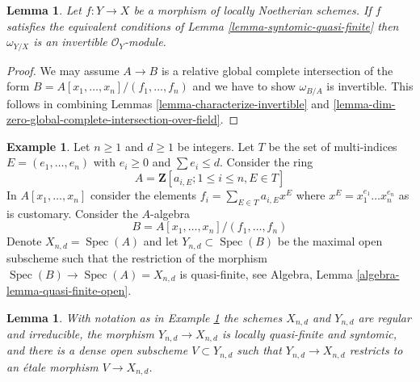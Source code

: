 \documentclass{stacks-project}
\theoremstyle{plain}
\newtheorem{lemma}[subsection]{Lemma}
\theoremstyle{definition}
\newtheorem{example}[subsection]{Example}
\theoremstyle{remark}
\numberwithin{equation}{subsection}
\def\Spec{\mathop{\mathrm{Spec}}}
\begin{document}
\begin{lemma}
\label{lemma-dualizing-syntomic-quasi-finite}
Let $f : Y \to X$ be a morphism of locally Noetherian schemes. If $f$
satisfies the equivalent conditions of Lemma \ref{lemma-syntomic-quasi-finite}
then $\omega_{Y/X}$ is an invertible $\mathcal{O}_Y$-module.
\end{lemma}

\begin{proof}
We may assume $A \to B$ is a relative global complete
intersection of the form $B = A[x_1, \ldots, x_n]/(f_1, \ldots, f_n)$
and we have to show $\omega_{B/A}$ is invertible.
This follows in combining Lemmas \ref{lemma-characterize-invertible} and
\ref{lemma-dim-zero-global-complete-intersection-over-field}.
\end{proof}

\begin{example}
\label{example-universal-quasi-finite-syntomic}
Let $n \geq 1$ and $d \geq 1$ be integers. Let $T$ be the set of
multi-indices $E = (e_1, \ldots, e_n)$ with $e_i \geq 0$ and
$\sum e_i \leq d$. Consider the ring
$$
A = \mathbf{Z}[a_{i, E} ; 1 \leq i \leq n, E \in T]
$$
In $A[x_1, \ldots, x_n]$ consider the elements
$f_i = \sum_{E \in T} a_{i, E} x^E$ where $x^E = x_1^{e_1} \ldots x_n^{e_n}$
as is customary. Consider the $A$-algebra
$$
B = A[x_1, \ldots, x_n]/(f_1, \ldots, f_n)
$$
Denote $X_{n, d} = \Spec(A)$ and let $Y_{n, d} \subset \Spec(B)$
be the maximal open subscheme such that the restriction of the
morphism $\Spec(B) \to \Spec(A) = X_{n, d}$ is quasi-finite, see
Algebra, Lemma \ref{algebra-lemma-quasi-finite-open}.
\end{example}

\begin{lemma}
\label{lemma-universal-quasi-finite-syntomic-etale}
With notation as in Example \ref{example-universal-quasi-finite-syntomic}
the schemes $X_{n, d}$ and $Y_{n, d}$ are regular and irreducible,
the morphism $Y_{n, d} \to X_{n, d}$ is locally quasi-finite and
syntomic, and there is a dense open subscheme $V \subset Y_{n, d}$
such that $Y_{n, d} \to X_{n, d}$ restricts to an \'etale morphism
$V \to X_{n, d}$.
\end{lemma}
\end{document}
